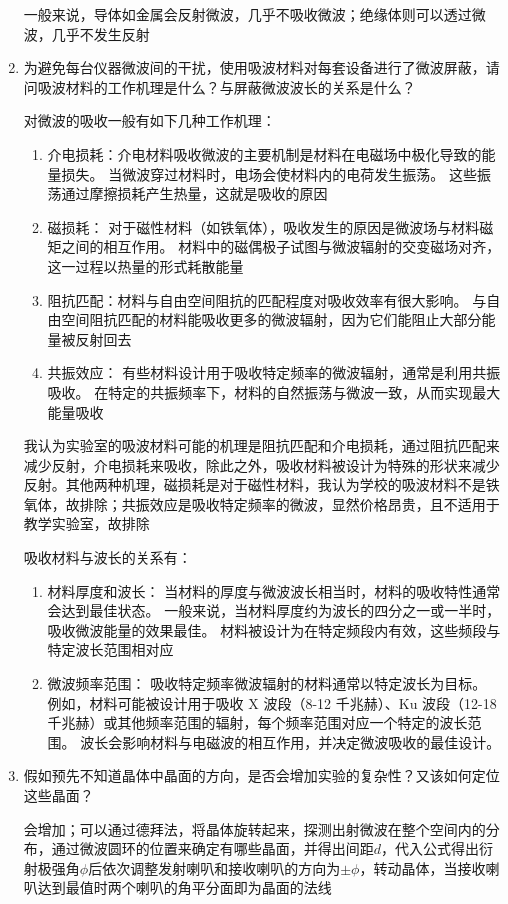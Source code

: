 \documentclass[11pt]{article}
\begin{document}
\begin{enumerate}
		一般来说，导体如金属会反射微波，几乎不吸收微波；绝缘体则可以透过微波，几乎不发生反射
		
		\item 为避免每台仪器微波间的干扰，使用吸波材料对每套设备进行了微波屏蔽，请问吸波材料的工作机理是什么？与屏蔽微波波长的关系是什么？\newline
		
		对微波的吸收一般有如下几种工作机理：
		\begin{enumerate}
			\item 介电损耗：介电材料吸收微波的主要机制是材料在电磁场中极化导致的能量损失。 当微波穿过材料时，电场会使材料内的电荷发生振荡。 这些振荡通过摩擦损耗产生热量，这就是吸收的原因
			\item 磁损耗： 对于磁性材料（如铁氧体），吸收发生的原因是微波场与材料磁矩之间的相互作用。 材料中的磁偶极子试图与微波辐射的交变磁场对齐，这一过程以热量的形式耗散能量
			\item 阻抗匹配：材料与自由空间阻抗的匹配程度对吸收效率有很大影响。 与自由空间阻抗匹配的材料能吸收更多的微波辐射，因为它们能阻止大部分能量被反射回去
			\item 共振效应： 有些材料设计用于吸收特定频率的微波辐射，通常是利用共振吸收。 在特定的共振频率下，材料的自然振荡与微波一致，从而实现最大能量吸收
		\end{enumerate}
		
		我认为实验室的吸波材料可能的机理是阻抗匹配和介电损耗，通过阻抗匹配来减少反射，介电损耗来吸收，除此之外，吸收材料被设计为特殊的形状来减少反射。其他两种机理，磁损耗是对于磁性材料，我认为学校的吸波材料不是铁氧体，故排除；共振效应是吸收特定频率的微波，显然价格昂贵，且不适用于教学实验室，故排除
		
		吸收材料与波长的关系有：
		\begin{enumerate}
			\item 材料厚度和波长： 当材料的厚度与微波波长相当时，材料的吸收特性通常会达到最佳状态。 一般来说，当材料厚度约为波长的四分之一或一半时，吸收微波能量的效果最佳。 材料被设计为在特定频段内有效，这些频段与特定波长范围相对应
			\item 微波频率范围： 吸收特定频率微波辐射的材料通常以特定波长为目标。 例如，材料可能被设计用于吸收 X 波段（8-12 千兆赫）、Ku 波段（12-18 千兆赫）或其他频率范围的辐射，每个频率范围对应一个特定的波长范围。 波长会影响材料与电磁波的相互作用，并决定微波吸收的最佳设计。
		\end{enumerate}
		
		\item 假如预先不知道晶体中晶面的方向，是否会增加实验的复杂性？又该如何定位这些晶面？\newline
		
		会增加；可以通过德拜法，将晶体旋转起来，探测出射微波在整个空间内的分布，通过微波圆环的位置来确定有哪些晶面，并得出间距\(d\)，代入公式得出衍射极强角\(\phi\)后依次调整发射喇叭和接收喇叭的方向为\(\pm \phi\)，转动晶体，当接收喇叭达到最值时两个喇叭的角平分面即为晶面的法线
		
	\end{enumerate}
	
\end{document}
